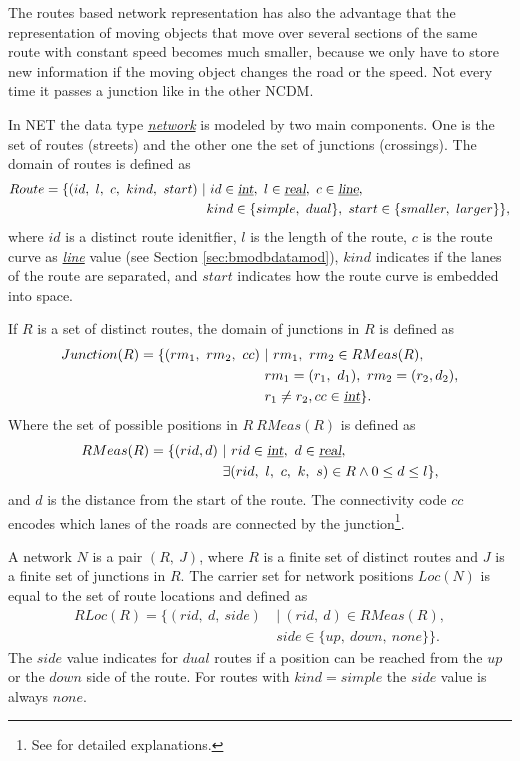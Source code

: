 \documentclass[a4paper]{article}
\newcommand{\dt}[1]{\textsl{\underline{#1}}}
\begin{document}
The routes based network representation has also the advantage that the
representation of moving objects that move over several sections of the same route
with constant speed becomes much smaller, because we only have to store new
information if the moving object changes the road or the speed. Not every time
it passes a junction like in the other NCDM.

In NET the data type \dt{network} is modeled by two main components. One is the
set  of routes (streets) and the other one the set of junctions (crossings). The
domain of routes is defined as
\[
\begin{split}
Route = \{(id,\ l,\ c,\ kind,\ start)\ &|\ id \in \dt{int},\ l \in \dt{real},
\ c \in \dt{line},\\
&\ kind \in \{simple,\ dual\},\ start \in \{smaller,\ larger\}\},
\end{split}
\]
where $id$ is a distinct route idenitfier, $l$ is the length of the route, $c$
is the route curve as \dt{line} value (see Section \ref{sec:bmodbdatamod}),
$kind$ indicates if the lanes of the route are separated, and $start$ indicates
how the route curve is embedded into space.

If $R$ is a set of distinct routes, the domain of junctions in $R$ is defined as
\[
  \begin{split}
    Junction(R)=\{(rm_1,\ rm_2,\ cc)\ &|\ rm_1,\ rm_2 \in RMeas(R),\\
&rm_1 = (r_1,\ d_1),\ rm_2 = (r_2, d_2),\\
&r_1 \neq r_2, cc \in \dt{int}\}.
  \end{split}
\]
Where the set of possible positions in $R\ RMeas(R)$ is defined as
\[
  \begin{split}
    RMeas(R) = \{(rid, d)\ &|\ rid \in \dt{int},\ d \in \dt{real},\\
&\exists (rid,\ l,\ c,\ k,\ s) \in R \wedge 0 \leq d \leq l\},
  \end{split}
\]
and $d$ is the distance from the start of the route.
The connectivity code $cc$ encodes which lanes of the roads are connected
by the junction\footnote{See \cite{NetworkGueting} for detailed explanations.}.

A network $N$ is a pair $(R,\ J)$, where $R$ is a finite set of distinct routes
and $J$ is a finite set of junctions in $R$. The carrier set for network
positions $Loc(N)$ is equal to the set of route locations and defined as
\[
  \begin{split}
    RLoc(R)=\{(rid,\ d,\ side)\ &|\ (rid,\ d) \in RMeas(R),\\
&side \in \{up,\ down,\ none\}\}.
  \end{split}
\]
The $side$ value indicates for $dual$ routes if a position can be reached
from the $up$ or the $down$ side of the route. For routes with $kind = simple$ the
$side$ value is always $none$.
\end{document}
